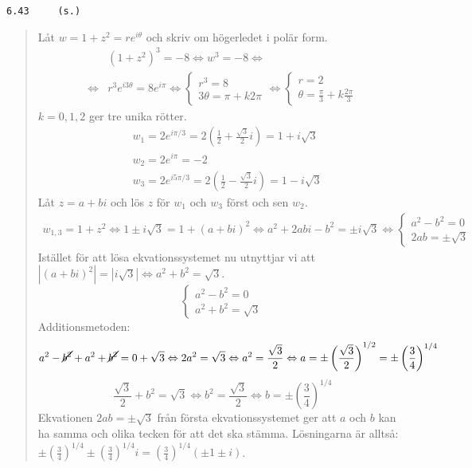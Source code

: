 \documentclass[a4paper]{article}
\newcommand{\tskcol}[1]{\textcolor{tskcol}{#1}}
\begin{document}
	\pagebreak
	\texttt{\tskcol{6.43~~~~ (s.)}}
	\begin{quotation}
		\noindent
		Låt $w=1+z^2=re^{i\theta}$ och skriv om högerledet i polär form.
		\begin{align*}
		&(1+z^2)^3=-8 \Leftrightarrow
		w^3=-8 \Leftrightarrow \\ \Leftrightarrow
		&r^3e^{i3\theta}=8e^{i\pi} \Leftrightarrow
		\begin{cases}
		r^3=8 \\
		3\theta = \pi + k2\pi
		\end{cases} \Leftrightarrow
		\begin{cases}
		r=2 \\
		\theta = \frac{\pi}{3} +k\frac{2\pi}{3}
		\end{cases}
		\end{align*}
		$k=0,1,2$ ger tre unika rötter.
		\begin{align*}
		&w_1=2e^{i\pi/3}=2(\tfrac{1}{2}+\tfrac{\sqrt{3}}{2}i)=1+i\sqrt{3} \\
		&w_2=2e^{i\pi}=-2 \\
		&w_3=2e^{i5\pi/3}=2(\tfrac{1}{2}-\tfrac{\sqrt{3}}{2}i)=1-i\sqrt{3}
		\end{align*}
		Låt $z=a+bi$ och lös $z$ för $w_1$ och $w_3$ först och sen $w_2$.
		\begin{align*}
		w_{1,3}=1+z^2 \Leftrightarrow
		1\pm i\sqrt{3}=1+(a+bi)^2 \Leftrightarrow
		a^2+2abi-b^2=\pm i\sqrt{3} \Leftrightarrow
		\begin{cases}
		a^2-b^2=0 \\
		2ab =\pm \sqrt{3}
		\end{cases}
		\end{align*}
		Istället för att lösa ekvationssystemet nu utnyttjar vi  att $|(a+bi)^2|=|i\sqrt{3}| \Leftrightarrow a^2+b^2=\sqrt{3}$.
		\[\begin{cases}
		a^2-b^2=0 \\
		a^2+b^2=\sqrt{3}
		\end{cases}\]
		Additionsmetoden:
		\[a^2-\cancel{b^2}+a^2+\cancel{b^2} = 0+\sqrt{3} \Leftrightarrow
		2a^2=\sqrt{3} \Leftrightarrow
		a^2=\frac{\sqrt{3}}{2} \Leftrightarrow
		a=\pm\left(\frac{\sqrt{3}}{2}\right)^{1/2}=
		\pm\left(\frac{3}{4}\right)^{1/4}\]
		\[\frac{\sqrt{3}}{2}+b^2=\sqrt{3} \Leftrightarrow
		b^2=\frac{\sqrt{3}}{2} \Leftrightarrow
		b=\pm\left(\frac{3}{4}\right)^{1/4}\]
		Ekvationen $2ab =\pm \sqrt{3}$ från första ekvationssystemet ger att $a$ och $b$ kan ha samma och olika tecken för att det ska stämma. Lösningarna är alltså: $\pm\left(\frac{3}{4}\right)^{1/4}\pm\left(\frac{3}{4}\right)^{1/4}i=\left(\frac{3}{4}\right)^{1/4}(\pm1\pm i)$.

\end{quotation}
\end{document}
